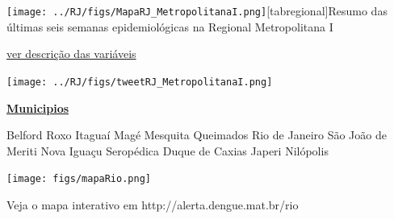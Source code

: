 \documentclass[10pt]{article} %
\begin{document}
  
\begin{minipage}[t]{.66\linewidth}\hypertarget{regional}{}\texttt{[image: ../RJ/figs/MapaRJ\_MetropolitanaI.png]}[tabregional]{Resumo das últimas seis semanas epidemiológicas na Regional Metropolitana I }\begin{center}\end{center}\small{\hyperlink{vartab}{ver descrição das variáveis}}\begin{center}\texttt{[image: ../RJ/figs/tweetRJ\_MetropolitanaI.png]}\end{center}\end{minipage}\hfill\begin{minipage}[t]{.30\linewidth}\begin{mdframed}[style=sidebar,frametitle={}]\textbf{\hyperlink{municips}{Municipios}}\begin{itemize}\gsquare Belford Roxo 
\gsquare Itaguaí 
\gsquare Magé 
\gsquare Mesquita 
\gsquare Queimados 
\gsquare Rio de Janeiro 
\gsquare São João de Meriti 
\gsquare Nova Iguaçu 
\gsquare Seropédica 
\gsquare Duque de Caxias 
\gsquare Japeri 
\gsquare Nilópolis \end{itemize}\BackToContents\end{mdframed}\hfill\end{minipage}\newpage  %
\begin{minipage}[t]{0.6\linewidth} %
\hypertarget{mun}{} %


\texttt{[image: figs/mapaRio.png]}

\small{Veja o mapa interativo em http://alerta.dengue.mat.br/rio}

\vspace{2cm}

\begin{center}

\end{center}

\BackToContents %
\end{minipage}
\end{document}
